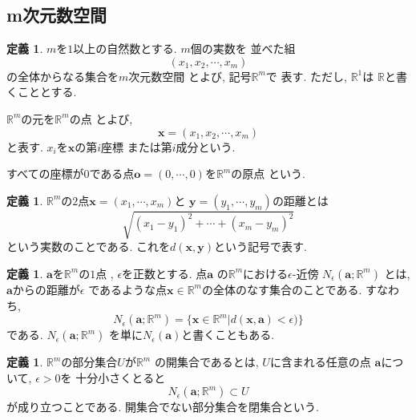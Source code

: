 \documentclass[a4j,12pt]{jarticle}
\theoremstyle{definition}
\newtheorem{definition}[theorem]{定義}
\newtheorem{proposition}[theorem]{命題}
\begin{document}
\subsection{m次元数空間}
\begin{definition}
    $m$を$1$以上の自然数とする. $m$個の実数を
    並べた組
    $$(x_1,x_2, \cdots ,x_m)$$
    の全体からなる集合を$m$次元数空間
    とよび, 記号$\mathbb{R}^m$で
    表す. ただし, $\mathbb{R}^1$は
    $\mathbb{R}$と書くこととする. 

    $\mathbb{R}^m$の元を$\mathbb{R}^m$の点
    とよび, 
    $$\boldsymbol{x}=(x_1,x_2, \cdots ,x_m)$$
    と表す. $x_i$を$\boldsymbol{x}$の第$i$座標
    または第$i$成分という. 

    すべての座標が$0$である点$\boldsymbol{o}
    =(0,\cdots ,0)$を$\mathbb{R}^m$の原点
    という. 
\end{definition}
\begin{definition}
    $\mathbb{R}^m$の$2$点$\boldsymbol{x}
    =(x_1,\cdots ,x_m)$と
    $\boldsymbol{y}
    =(y_1,\cdots ,y_m)$の距離とは
    $$\sqrt{(x_1-y_1)^2+\cdots +(x_m-y_m)^2}$$
    という実数のことである. これを$d(\boldsymbol{x},
    \boldsymbol{y})$という記号で表す. 
\end{definition}
\begin{definition}
    $\boldsymbol{a}$を$\mathbb{R}^m$の$1$点
    , $\epsilon$を正数とする. 点$\boldsymbol{a}$
    の$\mathbb{R}^m$における$\epsilon$-近傍
    $N_\epsilon(\boldsymbol{a};\mathbb{R}^m)$
    とは, $\boldsymbol{a}$からの距離が$\epsilon$
    であるような点$\boldsymbol{x}\in 
    \mathbb{R}^m$の全体のなす集合のことである. 
    すなわち, 
    $$N_\epsilon(\boldsymbol{a};\mathbb{R}^m)=
    \{\boldsymbol{x}\in \mathbb{R}^m
    |d(\boldsymbol{x},\boldsymbol{a})<\epsilon)
    \}$$
    である. $N_\epsilon(\boldsymbol{a};\mathbb{R}^m)$
    を単に$N_\epsilon(\boldsymbol{a})$と書くこともある. 
\end{definition}
\begin{definition}
    $\mathbb{R}^m$の部分集合$U$が$\mathbb{R}^m$
    の開集合であるとは, $U$に含まれる任意の点
    $\boldsymbol{a}$について, $\epsilon>0$を
    十分小さくとると
    $$N_\epsilon(\boldsymbol{a};\mathbb{R}^m)
    \subset U$$
    が成り立つことである. 
    開集合でない部分集合を閉集合という. 
\end{definition}

\end{document}
